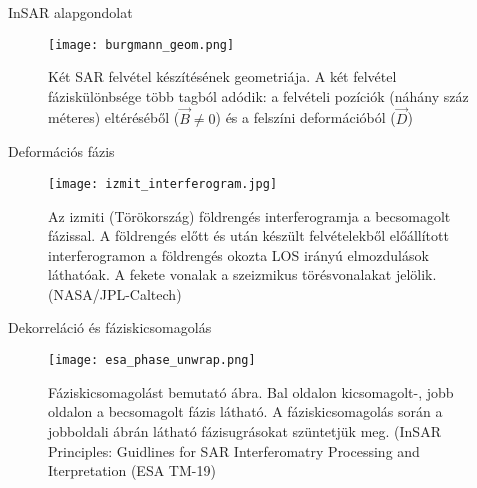 \documentclass[14pt, aspectratio=169]{beamer}
\begin{document}

\begin{frame}{InSAR alapgondolat}
    \begin{figure}
        \centering
        \texttt{[image: burgmann\_geom.png]}
       \caption{Két SAR felvétel készítésének geometriája. A két felvétel fáziskülönbsége több tagból adódik: a felvételi pozíciók (náhány száz méteres) eltéréséből ($\vec{B} \ne 0$) és a felszíni deformációból ($\vec{D}$)}
    \end{figure}
\end{frame}


\begin{frame}{Deformációs fázis}
    \begin{figure}
        \centering
        \texttt{[image: izmit\_interferogram.jpg]}
        \caption{Az izmiti (Törökország) földrengés interferogramja a becsomagolt fázissal. A földrengés előtt és után készült felvételekből előállított interferogramon a földrengés okozta LOS irányú elmozdulások láthatóak. A fekete vonalak a szeizmikus törésvonalakat jelölik. (NASA/JPL-Caltech)}
    \end{figure}
\end{frame}



\begin{frame}{Dekorreláció és fáziskicsomagolás}
    \begin{figure}
        \centering
        \texttt{[image: esa\_phase\_unwrap.png]}
        \caption{Fáziskicsomagolást bemutató ábra. Bal oldalon kicsomagolt-, jobb oldalon a becsomagolt fázis látható. A fáziskicsomagolás során a jobboldali ábrán látható fázisugrásokat szüntetjük meg. (InSAR Principles: Guidlines for SAR Interferomatry Processing and Iterpretation (ESA TM-19)}\label{unwrapping}
    \end{figure}
\end{frame}

\end{document}
